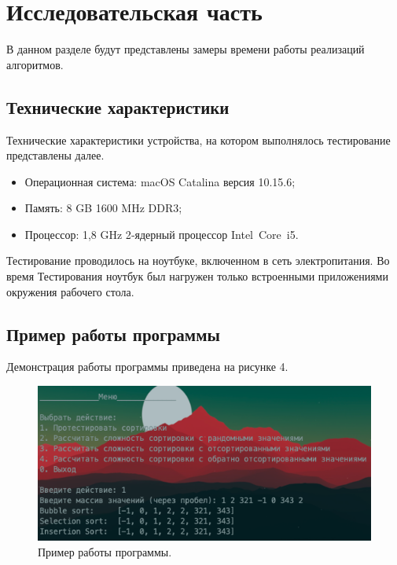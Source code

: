 \documentclass[14pt,russian]{scrartcl}
\begin{document}
\section{Исследовательская часть}

В данном разделе будут представлены замеры времени работы реализаций алгоритмов.

\subsection{Технические характеристики}

Технические характеристики устройства, на котором выполнялось тестирование представлены далее.

\begin{itemize}
    \item Операционная система: macOS Catalina версия 10.15.6;
    \item Память: 8 GB 1600 MHz DDR3;
    \item Процессор: 1,8 GHz 2‑ядерный процессор Intel Core i5.
\end{itemize}

Тестирование проводилось на ноутбуке, включенном в сеть электропитания.
Во время Тестирования ноутбук был нагружен только встроенными приложениями окружения рабочего стола.

\subsection{Пример работы программы}

Демонстрация работы программы приведена на рисунке 4.
\vspace{5mm}

\begin{figure}[h]
	\begin{center}
	\includegraphics[scale=1]{example.png}
	 \caption{Пример работы программы.}
	\end{center}
\end{figure}
\end{document}

